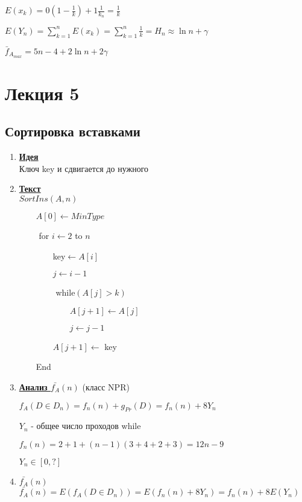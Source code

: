 \documentclass[12pt]{report}
\begin{document}
\begin{enumerate}
		$E(x_k)=0(1-\frac{1}{k}) + 1\frac{1}{k_n}=\frac{1}{k}$\par
		$E(Y_n)=\sum_{k=1}^n E(x_k)=\sum_{k=1}^n \frac{1}{k}=H_n \approx \ln n + \gamma$\par
		$\bar{f}_{A_{max}} = 5n-4+2\ln n+2\gamma$
	\end{enumerate}


	\chapter*{Лекция 5}
	\section*{Сортировка вставками}
	\begin{enumerate}
		\item \textbf{\underline{Идея}}\\
		Ключ key и сдвигается до нужного
		\item \textbf{\underline{Текст}}\\
		$SortIns(A,n)$\par
		$\qquad A[0] \leftarrow MinType$\par
		$\qquad$ for $i \leftarrow 2$ to $n$\par
		$\qquad\qquad $key$ \leftarrow A[i]$\par
		$\qquad\qquad j \leftarrow i-1$\par
		$\qquad\qquad$ while$(A[j] > k)$\par
		$\qquad\qquad\qquad A[j+1] \leftarrow A[j]$\par
		$\qquad\qquad\qquad j \leftarrow j-1$\par
		$\qquad\qquad A[j+1] \leftarrow$ key\par
		$\qquad$End\par
		\item \textbf{\underline{Анализ $\bar{f_A}(n)$}} (класс NPR)\par
		$f_A(D \in D_n) = f_n(n) + g_{Pr}(D) = f_n(n) + 8Y_n$\par
		$Y_n$ - общее число проходов while\par
		$f_n(n)=2+1+(n-1)(3+4+2+3) = 12n - 9$\par
		$Y_n \in [0,?]$\par
		\item \textbf{\underline{$\bar{f_A}(n)$}}\\
		$\bar{f_A}(n) = E(f_A(D \in D_n)) = E(f_n(n) + 8Y_n) = f_n(n)+8E(Y_n)$\\

\end{enumerate}
\end{document}
